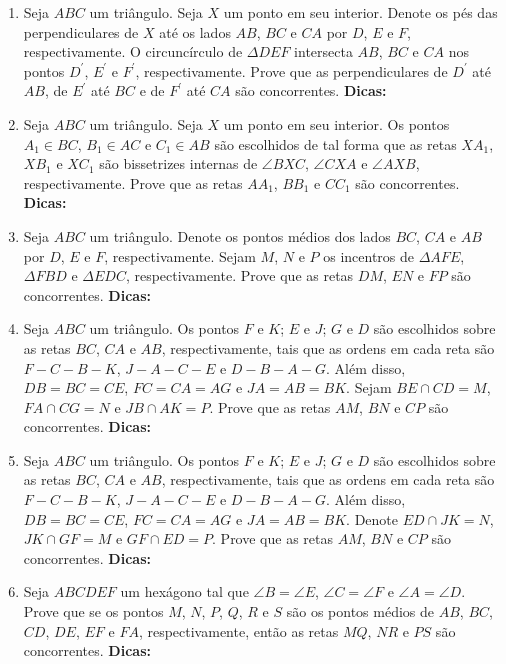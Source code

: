 \documentclass{article}
\newcommand{\dica}{\textbf{Dicas:}}
\newcommand{\iniTri}{Seja $ABC$ um triângulo}
\begin{document}
\begin{multicols}{2}
\begin{enumerate}
    \item \iniTri. Seja $X$ um ponto em seu interior. Denote os pés das perpendiculares de $X$ até os lados $AB$, $BC$ e $CA$ por $D$, $E$ e $F$, respectivamente. O circuncírculo de $\Delta DEF$ intersecta $AB$, $BC$ e $CA$ nos pontos $D^{\prime}$, $E^{\prime}$ e $F^{\prime}$, respectivamente. Prove que as perpendiculares de $D^{\prime}$ até $AB$, de $E^{\prime}$ até $BC$ e de $F^{\prime}$ até $CA$ são concorrentes. \dica %
    
    \item \iniTri. Seja $X$ um ponto em seu interior. Os pontos $A_1\in BC$, $B_1\in AC$ e $C_1\in AB$ são escolhidos de tal forma que as retas $XA_1$, $XB_1$ e $XC_1$ são bissetrizes internas de $\angle BXC$, $\angle CXA$ e $\angle AXB$, respectivamente. Prove que as retas $AA_1$, $BB_1$ e $CC_1$ são concorrentes. \dica %
    
    \item \iniTri. Denote os pontos médios dos lados $BC$, $CA$ e $AB$ por $D$, $E$ e $F$, respectivamente. Sejam $M$, $N$ e $P$ os incentros de $\Delta AFE$, $\Delta FBD$ e $\Delta EDC$, respectivamente. Prove que as retas $DM$, $EN$ e $FP$ são concorrentes. \dica %
    
    \item \iniTri. Os pontos $F$ e $K$; $E$ e $J$; $G$ e $D$ são escolhidos sobre as retas $BC$, $CA$ e $AB$, respectivamente, tais que as ordens em cada reta são $F-C-B-K$, $J-A-C-E$ e $D-B-A-G$. Além disso, $DB=BC=CE$, $FC=CA=AG$ e $JA=AB=BK$. Sejam $BE\cap CD=M$, $FA\cap CG=N$ e $JB\cap AK=P$. Prove que as retas $AM$, $BN$ e $CP$ são concorrentes. \dica %
    
    \item \iniTri. Os pontos $F$ e $K$; $E$ e $J$; $G$ e $D$ são escolhidos sobre as retas $BC$, $CA$ e $AB$, respectivamente, tais que as ordens em cada reta são $F-C-B-K$, $J-A-C-E$ e $D-B-A-G$. Além disso, $DB=BC=CE$, $FC=CA=AG$ e $JA=AB=BK$. Denote $ED\cap JK=N$, $JK\cap GF=M$ e $GF\cap ED=P$. Prove que as retas $AM$, $BN$ e $CP$ são concorrentes. \dica %
    
    \item Seja $ABCDEF$ um hexágono tal que $\angle B=\angle E$, $\angle C=\angle F$ e $\angle A=\angle D$. Prove que se os pontos $M$, $N$, $P$, $Q$, $R$ e $S$ são os pontos médios de $AB$, $BC$, $CD$, $DE$, $EF$ e $FA$, respectivamente, então as retas $MQ$, $NR$ e $PS$ são concorrentes. \dica %
    

\end{enumerate}
\end{multicols}
\end{document}
